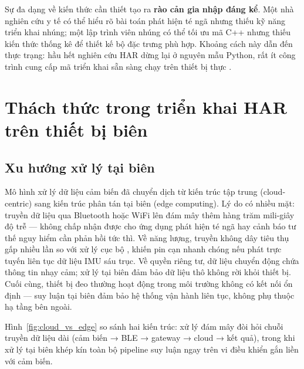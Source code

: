 Sự đa dạng về kiến thức cần thiết tạo ra \textbf{rào cản gia nhập đáng kể}. Một nhà nghiên cứu y tế có thể hiểu rõ bài toán phát hiện té ngã nhưng thiếu kỹ năng triển khai nhúng; một lập trình viên nhúng có thể tối ưu mã C++ nhưng thiếu kiến thức thống kê để thiết kế bộ đặc trưng phù hợp. Khoảng cách này dẫn đến thực trạng: hầu hết nghiên cứu HAR dừng lại ở nguyên mẫu Python, rất ít công trình cung cấp mã triển khai sẵn sàng chạy trên thiết bị thực \cite{paleyes2022challenges}.

\section{Thách thức trong triển khai HAR trên thiết bị biên}
\label{sec:intro_challenges}

\subsection{Xu hướng xử lý tại biên}

Mô hình xử lý dữ liệu cảm biến đã chuyển dịch từ kiến trúc tập trung (cloud-centric) sang kiến trúc phân tán tại biên (edge computing). Lý do có nhiều mặt: truyền dữ liệu qua Bluetooth hoặc WiFi lên đám mây thêm hàng trăm mili-giây độ trễ --- không chấp nhận được cho ứng dụng phát hiện té ngã hay cảnh báo tư thế nguy hiểm cần phản hồi tức thì. Về năng lượng, truyền không dây tiêu thụ gấp nhiều lần so với xử lý cục bộ \cite{warden2019tinyml}, khiến pin cạn nhanh chóng nếu phát trực tuyến liên tục dữ liệu IMU sáu trục. Về quyền riêng tư, dữ liệu chuyển động chứa thông tin nhạy cảm; xử lý tại biên đảm bảo dữ liệu thô không rời khỏi thiết bị. Cuối cùng, thiết bị đeo thường hoạt động trong môi trường không có kết nối ổn định --- suy luận tại biên đảm bảo hệ thống vận hành liên tục, không phụ thuộc hạ tầng bên ngoài.

Hình~\ref{fig:cloud_vs_edge} so sánh hai kiến trúc: xử lý đám mây đòi hỏi chuỗi truyền dữ liệu dài (cảm biến → BLE → gateway → cloud → kết quả), trong khi xử lý tại biên khép kín toàn bộ pipeline suy luận ngay trên vi điều khiển gắn liền với cảm biến.

